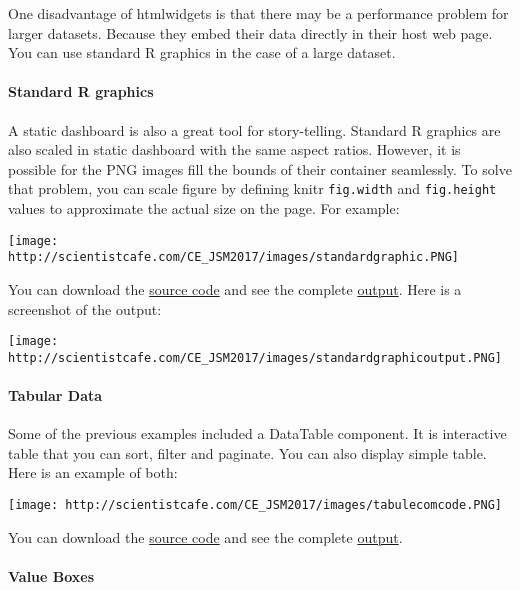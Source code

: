 \documentclass[
]{article}
\begin{document}
One disadvantage of htmlwidgets is that there may be a performance
problem for larger datasets. Because they embed their data directly in
their host web page. You can use standard R graphics in the case of a
large dataset.

\hypertarget{standard-r-graphics}{%
\paragraph{Standard R graphics}\label{standard-r-graphics}}

A static dashboard is also a great tool for story-telling. Standard R
graphics are also scaled in static dashboard with the same aspect
ratios. However, it is possible for the PNG images fill the bounds of
their container seamlessly. To solve that problem, you can scale figure
by defining knitr \texttt{fig.width} and \texttt{fig.height} values to
approximate the actual size on the page. For example:

\texttt{[image: http://scientistcafe.com/CE\_JSM2017/images/standardgraphic.PNG]}

You can download the
\href{http://scientistcafe.com/CE_JSM2017/Examples/basicgraphic.Rmd}{source
code} and see the complete
\href{http://scientistcafe.com/CE_JSM2017/Examples/basicgraphic.html}{output}.
Here is a screenshot of the output:

\texttt{[image: http://scientistcafe.com/CE\_JSM2017/images/standardgraphicoutput.PNG]}

\hypertarget{tabular-data}{%
\paragraph{Tabular Data}\label{tabular-data}}

Some of the previous examples included a DataTable component. It is
interactive table that you can sort, filter and paginate. You can also
display simple table. Here is an example of both:

\texttt{[image: http://scientistcafe.com/CE\_JSM2017/images/tabulecomcode.PNG]}

You can download the
\href{http://scientistcafe.com/CE_JSM2017/Examples/tabularcom.Rmd}{source
code} and see the complete
\href{http://scientistcafe.com/CE_JSM2017/Examples/tabularcom.html}{output}.

\hypertarget{value-boxes}{%
\paragraph{Value Boxes}\label{value-boxes}}
\end{document}
